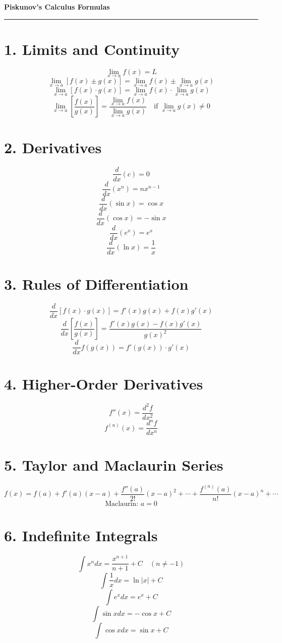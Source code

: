 \documentclass[fleqn]{article}
\begin{document}
\begin{center}
  {\LARGE \textbf{Piskunov's Calculus Formulas}}\\[6pt]
  \rule{\linewidth}{0.5pt}
\end{center}

\begin{multicols}{2}
\small

\section*{1. Limits and Continuity}
\[
\lim_{x \to a} f(x) = L
\]
\[
\lim_{x \to a} [f(x) \pm g(x)] = \lim_{x \to a} f(x) \pm \lim_{x \to a} g(x)
\]
\[
\lim_{x \to a} [f(x) \cdot g(x)] = \lim_{x \to a} f(x) \cdot \lim_{x \to a} g(x)
\]
\[
\lim_{x \to a} \left[ \frac{f(x)}{g(x)} \right] = \frac{\lim_{x \to a} f(x)}{\lim_{x \to a} g(x)} \quad \text{if } \lim_{x \to a} g(x) \ne 0
\]

\section*{2. Derivatives}
\[
\frac{d}{dx}(c) = 0
\]
\[
\frac{d}{dx}(x^n) = nx^{n-1}
\]
\[
\frac{d}{dx}(\sin x) = \cos x
\]
\[
\frac{d}{dx}(\cos x) = -\sin x
\]
\[
\frac{d}{dx}(e^x) = e^x
\]
\[
\frac{d}{dx}(\ln x) = \frac{1}{x}
\]

\section*{3. Rules of Differentiation}
\[
\frac{d}{dx}[f(x) \cdot g(x)] = f'(x)g(x) + f(x)g'(x)
\]
\[
\frac{d}{dx}\left[ \frac{f(x)}{g(x)} \right] = \frac{f'(x)g(x) - f(x)g'(x)}{g(x)^2}
\]
\[
\frac{d}{dx} f(g(x)) = f'(g(x)) \cdot g'(x)
\]

\section*{4. Higher-Order Derivatives}
\[
f''(x) = \frac{d^2f}{dx^2}
\]
\[
f^{(n)}(x) = \frac{d^n f}{dx^n}
\]

\section*{5. Taylor and Maclaurin Series}
\[
f(x) = f(a) + f'(a)(x - a) + \frac{f''(a)}{2!}(x - a)^2 + \cdots + \frac{f^{(n)}(a)}{n!}(x - a)^n + \cdots
\]
\[
\text{Maclaurin: } a = 0
\]

\section*{6. Indefinite Integrals}
\[
\int x^n dx = \frac{x^{n+1}}{n+1} + C \quad (n \ne -1)
\]
\[
\int \frac{1}{x} dx = \ln|x| + C
\]
\[
\int e^x dx = e^x + C
\]
\[
\int \sin x dx = -\cos x + C
\]
\[
\int \cos x dx = \sin x + C
\]


\end{multicols}
\end{document}
